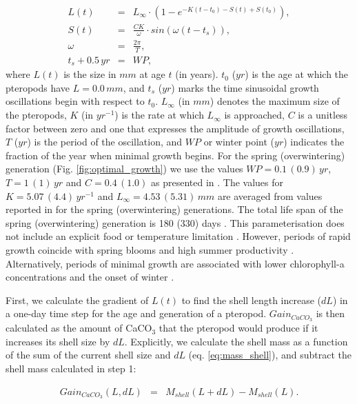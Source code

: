 {\scriptsize
\begin{eqnarray}
L(t) & = & L_{\infty} \cdot (1 - e^{-K(t-t_0) - S(t) + S(t_0)}),  \label{eq:shell_size}\\
S(t) & = & \frac{CK}{\omega} \cdot sin(\omega (t-t_s)), \\
\omega & = & \frac{2\pi}{T}, \\
t_s + 0.5\, yr & = & WP,
\end{eqnarray}}
\noindent
where $L(t)$ is the size in $mm$ at age $t$ (in years). $t_0$ ($yr$) is the age at which the pteropods have $L=0.0\, mm$, and $t_s$ ($yr$) marks the time sinusoidal growth oscillations begin with respect to $t_0$. $L_{\infty}$ (in $mm$) denotes the maximum size of the pteropods, $K$ (in $yr^{-1}$) is the rate at which $L_{\infty}$ is approached, $C$ is a unitless factor between zero and one that expresses the amplitude of growth oscillations, $T$ ($yr$) is the period of the oscillation, and $WP$ or winter point ($yr$) indicates the fraction of the year when minimal growth begins. For the spring (overwintering) generation (Fig. \ref{fig:optimal_growth}) we use the values $WP=0.1\, (0.9)\, yr$, $T=1\, (1)\, yr$ and $C=0.4\,(1.0)$ as presented in \citet{Wang2017Lifecycle}. The values for $K=5.07\, (4.4)\,yr^{-1}$ and $L_{\infty} = 4.53\,(5.31)\, mm$ are averaged from values reported in \cite{Wang2017Lifecycle} for the spring (overwintering) generations. The total life span of the spring (overwintering) generation is 180 (330) days \citep{Wang2017Lifecycle}. This parameterisation does not include an explicit food or temperature limitation \citep{Wang2017Lifecycle}. However, periods of rapid growth coincide with spring blooms and high summer productivity \citep{Wang2017Lifecycle,Maas2020Lipids}. Alternatively, periods of minimal growth are associated with lower chlorophyll-a concentrations and the onset of winter \citep{Wang2017Lifecycle,Maas2020Lipids}.


First, we calculate the gradient of $L(t)$ to find the shell length increase ($dL$) in a one-day time step for the age and generation of a pteropod. $Gain_{CaCO_3}$ is then calculated as the amount of CaCO$_3$ that the pteropod would produce if it increases its shell size by $dL$. Explicitly, we calculate the shell mass as a function of the sum of the current shell size and $dL$ (eq. \ref{eq:mass_shell}), and subtract the shell mass calculated in step 1:

{\scriptsize
\begin{eqnarray}
Gain_{CaCO_3}(L,dL) & = & M_{shell}(L+dL) - M_{shell}(L).
\end{eqnarray}}

